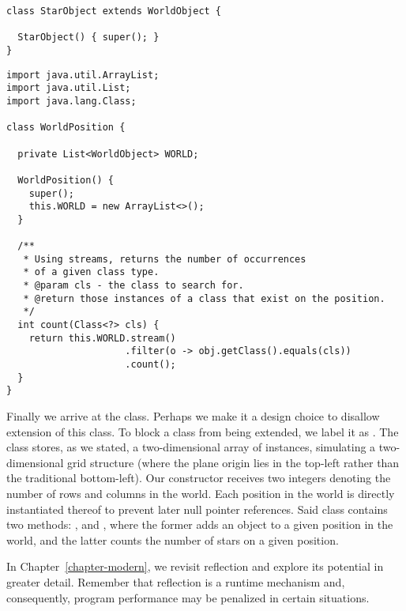 \begin{lstlisting}[language=MyJava]
class StarObject extends WorldObject {
  
  StarObject() { super(); }
}
\end{lstlisting}


\begin{lstlisting}[language=MyJava]
import java.util.ArrayList;
import java.util.List;
import java.lang.Class;

class WorldPosition {

  private List<WorldObject> WORLD;

  WorldPosition() { 
    super(); 
    this.WORLD = new ArrayList<>();  
  }

  /**
   * Using streams, returns the number of occurrences 
   * of a given class type.
   * @param cls - the class to search for.
   * @return those instances of a class that exist on the position.
   */
  int count(Class<?> cls) {
    return this.WORLD.stream()
                     .filter(o -> obj.getClass().equals(cls))
                     .count();
  }
}
\end{lstlisting}

Finally we arrive at the  class. Perhaps we make it a design choice to disallow extension of this class. To block a class from being extended, we label it as . The  class stores, as we stated, a two-dimensional array of  instances, simulating a two-dimensional grid structure (where the plane origin lies in the top-left rather than the traditional bottom-left). Our constructor receives two integers denoting the number of rows and columns in the world. Each position in the world is directly instantiated thereof to prevent later null pointer references. Said  class contains two methods: , and , where the former adds an object to a given position in the world, and the latter counts the number of stars on a given position.

In Chapter~\ref{chapter-modern}, we revisit reflection and explore its potential in greater detail. Remember that reflection is a runtime mechanism and, consequently, program performance may be penalized in certain situations.

